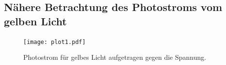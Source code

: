 
\subsection{Nähere Betrachtung des Photostroms vom gelben Licht} %
\label{sub:Nähere Betrachtung des Photostroms vom gelben Licht}

\begin{figure}
  \centering
  \texttt{[image: plot1.pdf]}
  \caption{Photostrom für gelbes Licht aufgetragen gegen die Spannung.}
  \label{fig:plot1}
\end{figure}

